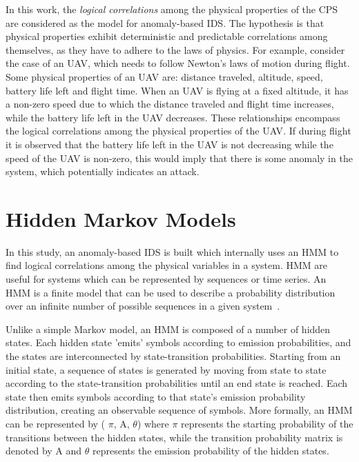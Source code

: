 In this work, the {\em logical correlations} among the physical properties of the \ac{CPS} are considered as the model for anomaly-based \ac{IDS}. The hypothesis is that physical properties exhibit deterministic and predictable correlations among themselves, as they have to adhere to the laws of physics. For example, consider the case of an \ac{UAV}, which needs to follow Newton's laws of motion during flight. Some physical properties of an \ac{UAV} are: distance traveled, altitude, speed, battery life left and flight time. When an \ac{UAV} is flying at a fixed altitude, it has a non-zero speed due to which the distance traveled and flight time increases, while the battery life left in the \ac{UAV} decreases. These relationships encompass the logical correlations among the physical properties of the \ac{UAV}. If during flight it is observed that the battery life left in the \ac{UAV} is not decreasing while the speed of the \ac{UAV} is non-zero, this would imply that there is some anomaly in the system, which potentially indicates an attack.

\section{Hidden Markov Models}
\label{sec:HMM_explain}

In this study, an anomaly-based \ac{IDS} is built which internally uses an \ac{HMM} to find logical correlations among the physical variables in a system. \ac{HMM} are useful for systems which can be represented by sequences or time series. An \ac{HMM} is a finite model that can be used to describe a probability distribution over an infinite number of possible sequences in a given system~\cite{eddy1996hidden}.

Unlike a simple Markov model, an \ac{HMM} is composed of a number of hidden states. Each hidden state 'emits' symbols according to emission probabilities, and the states are interconnected by state-transition probabilities. Starting from an initial state, a sequence of states is generated by moving from state to state according to the state-transition probabilities until an end state is reached. Each state then emits symbols according to that state's emission probability distribution, creating an observable sequence of symbols.
More formally, an \ac{HMM} can be represented by ( $\pi$, A, $\theta$) where $\pi$ represents the starting probability of the transitions between the hidden states, while the transition probability matrix is denoted by A and $\theta$ represents the emission probability of the hidden states.

